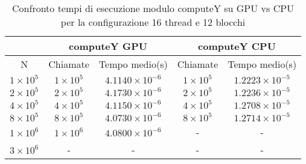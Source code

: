 \begin{table}[ht!]
    \begin{center}
        \renewcommand{\arraystretch}{1.5}
        \begin{adjustbox}{width=.65\textwidth}
            \begin{tabular}{ |c|c|c|c|c| }
                \hline
                \multicolumn{1}{|c}{} & \multicolumn{2}{|c}{computeY GPU} & \multicolumn{2}{|c|}{computeY CPU} \\
                \hline
                N & Chiamate & Tempo medio(s) & Chiamate & Tempo medio(s) \\
                \hline 
                $1 \times 10^5$ & $1 \times 10^{5}$ & $4.1140 \times 10^{-6}$ & $1 \times 10^{5}$ & $1.2223 \times 10^{-5}$ \\
                \hline 
                $2 \times 10^5$ & $2 \times 10^{5}$ & $4.1730 \times 10^{-6}$ & $2 \times 10^{5}$ & $1.2236 \times 10^{-5}$ \\
                \hline 
                $4 \times 10^5$ & $4 \times 10^{5}$ & $4.1150 \times 10^{-6}$ & $4 \times 10^{5}$ & $1.2708 \times 10^{-5}$ \\
                \hline 
                $8 \times 10^5$ & $8 \times 10^{5}$ & $4.0730 \times 10^{-6}$ & $8 \times 10^{5}$ & $1.2714 \times 10^{-5}$ \\
                \hline 
                $1 \times 10^6$ & $1 \times 10^{6}$ & $4.0800 \times 10^{-6}$ & - & - \\ 
                \hline
                $3 \times 10^6$ & - & - & - & - \\
                \hline
            \end{tabular}
        \end{adjustbox}
    \end{center}
    \caption{Confronto tempi di esecuzione modulo computeY su GPU vs CPU per la configurazione 16 thread e 12 blocchi}
    \label{tab:computeY_kernel_table_16x12}
\end{table}

\vspace{3cm}

